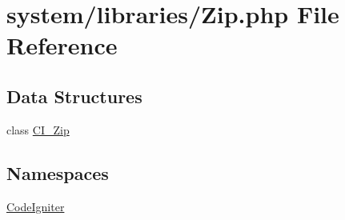 \hypertarget{_zip_8php}{\section{system/libraries/\-Zip.php File Reference}
\label{_zip_8php}
}
\subsection*{Data Structures}
\begin{DoxyCompactItemize}
\item 
class \hyperlink{class_c_i___zip}{C\-I\-\_\-\-Zip}
\end{DoxyCompactItemize}
\subsection*{Namespaces}
\begin{DoxyCompactItemize}
\item 
\hyperlink{namespace_code_igniter}{Code\-Igniter}
\end{DoxyCompactItemize}
